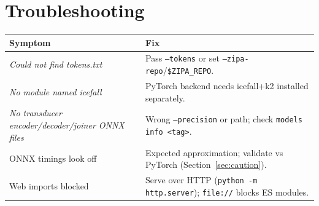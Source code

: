 \documentclass[11pt,a4paper]{article}
\newcommand{\code}[1]{\texttt{#1}}
\begin{document}
\section{Troubleshooting}
\begin{longtable}{@{}p{}p{}@{}}
\toprule
\textbf{Symptom} & \textbf{Fix} \\
\midrule
\endhead
\emph{Could not find tokens.txt} & Pass \code{--tokens} or set \code{--zipa-repo}/\code{\$ZIPA\_REPO}. \\
\emph{No module named icefall} & PyTorch backend needs icefall+k2 installed separately. \\
\emph{No transducer encoder/decoder/joiner ONNX files} & Wrong \code{--precision} or path; check \code{models info <tag>}. \\
ONNX timings look off & Expected approximation; validate vs PyTorch (Section~\ref{sec:caution}). \\
Web imports blocked & Serve over HTTP (\code{python -m http.server}); \code{file://} blocks ES modules. \\
\bottomrule
\end{longtable}
\end{document}

